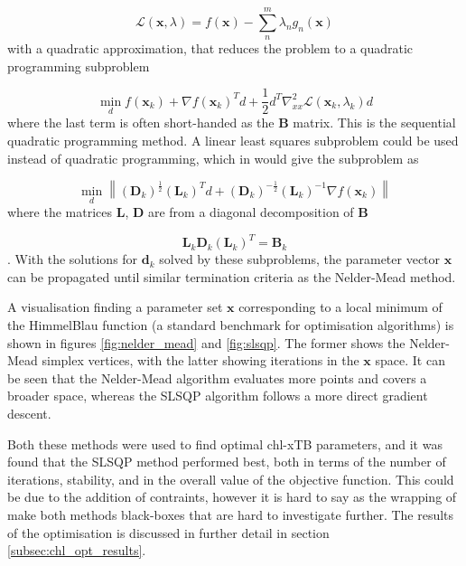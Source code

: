 \begin{equation}
\mathcal{L} \left(\mathbf{x}, \lambda\right) = f\left(\mathbf{x}\right) - \sum^m_n \lambda_n g_n \left( \mathbf{x}\right)
\end{equation}
%
with a quadratic approximation, that reduces the problem to a quadratic programming
subproblem

\begin{equation}
\min_d f\left(\mathbf{x}_k\right) + \nabla f\left(\mathbf{x}_k\right)^T d + \frac{1}{2}d^T \nabla^2_{xx} \mathcal{L} \left(\mathbf{x}_k, \lambda_k \right) d
\end{equation}
%
where the last term is often short-handed as the $\mathbf{B}$ matrix. This is the 
sequential quadratic programming method. A linear least squares subproblem could
be used instead of quadratic programming, which in would give the subproblem as

\begin{equation}
\min_d \left\| \left(\mathbf{D}_k\right)^{\frac{1}{2}} \left(\mathbf{L}_k\right)^T d + \left(\mathbf{D}_k\right)^{-\frac{1}{2}}\left(\mathbf{L}_k\right)^{-1}\nabla f \left(\mathbf{x}_k\right)\right\|
\end{equation}
%
where the matrices $\mathbf{L}$, $\mathbf{D}$ are from a diagonal decomposition 
of $\mathbf{B}$

\begin{equation}
\mathbf{L}_k \mathbf{D}_k \left(\mathbf{L}_k\right)^T = \mathbf{B}_k
\end{equation}
%
. With the solutions for $\mathbf{d}_k$ solved by these subproblems, the parameter vector
$\mathbf{x}$ can be propagated until similar termination criteria as the Nelder-Mead
method.

A visualisation finding a parameter set $\mathbf{x}$ corresponding to a local minimum
of the HimmelBlau function (a standard benchmark for optimisation algorithms) is
shown in figures \ref{fig:nelder_mead} and \ref{fig:slsqp}. The former shows the 
Nelder-Mead simplex vertices, with the latter showing iterations in the $\mathbf{x}$
space. It can be seen that the Nelder-Mead algorithm evaluates more points and covers
a broader space, whereas the SLSQP algorithm follows a more direct gradient descent. 

Both these methods were used to find optimal chl-xTB parameters, and it was found 
that the SLSQP method performed best, both in terms of the number of iterations,
stability, and in the overall value of the objective function. This could be due 
to the addition of contraints, however it is hard to say as the wrapping of 
make both methods black-boxes that are hard to investigate further. The results
of the optimisation is discussed in further detail in section \ref{subsec:chl_opt_results}.

